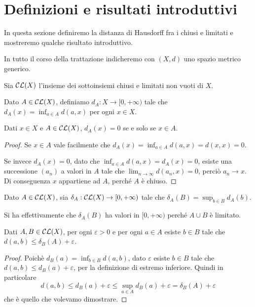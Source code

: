 \section{Definizioni e risultati introduttivi}
In questa sezione definiremo la distanza di Hausdorff fra i chiusi e limitati e mostreremo qualche risultato introduttivo.

In tutto il corso della trattazione indicheremo con $(X,d)$ uno spazio metrico generico.

\begin{definition}
	Sia $\mathcal{CL}(X)$ l'insieme dei sottoinsiemi chiusi e limitati non vuoti di $X$.
\end{definition}

\begin{definition}
	Dato $A\in \mathcal{CL}(X)$, definiamo $d_A: X\to [0,+\infty)$ tale che $d_A(x)=\inf_{a\in A}d(a,x)$ per ogni $x\in X$.
\end{definition}

\begin{lemma}\label{DistanzaChiusoAppartenenza}
	Dati $x\in X$ e $A \in \mathcal{CL}(X)$, $d_A(x)=0$ se e solo se $x\in A$.
\end{lemma}
\begin{proof}
	Se $x\in A$ vale facilmente che $d_A(x)=\inf_{a\in A}d(a,x)=d(x,x)=0$. 

	Se invece $d_A(x)=0$, dato che $\inf_{a\in A}d(a,x)=d_A(x)=0$, esiste una successione $(a_n)$ a valori in $A$ tale che $\lim_{n\to\infty}d(a_n,x)=0$, perciò $a_n\to x$. Di conseguenza $x$ appartiene ad $A$, perché $A$ è chiuso. 
\end{proof}


\begin{definition}\label{DistanzaAsimmetrica}
	Dato $A\in\mathcal{CL}(X)$, sia $\delta_A:\mathcal{CL}(X)\to [0,+\infty)$ tale che $\delta_A(B)=\sup_{b\in B} d_A(b)$.
\end{definition}
\begin{remark}
	Si ha effettivamente che $\delta_A(B)$ ha valori in $[0,+\infty)$ perché $A\cup B$ è limitato.
\end{remark}

\begin{lemma}\label{ApprossimazioneDistanzaAsimmetrica}
	Dati $A,B\in \mathcal{CL}(X)$, per ogni $\varepsilon>0$ e per ogni $a\in A$ esiste $b\in B$ tale che $d(a,b)\le \delta_B(A)+\varepsilon$.
\end{lemma}
\begin{proof}
	Poichè $d_B(a)=\inf_{b\in B}d(a,b)$, dato $\varepsilon$ esiste $b\in B$ tale che $d(a,b)\le d_B(a)+\varepsilon$, per la definizione di estremo inferiore. Quindi in particolare
	\begin{equation*}
		d(a,b)\le d_B(a)+\varepsilon\le \sup_{a\in A}d_B(a)+\varepsilon=\delta_B(A)+\varepsilon
	\end{equation*}
	che è quello che volevamo dimostrare.
\end{proof}

